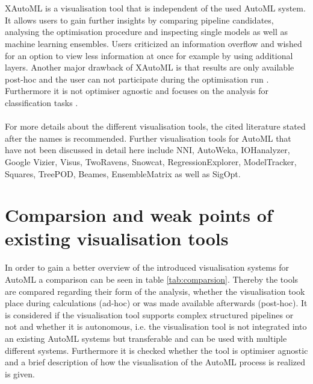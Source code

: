 \\ \\
XAutoML \cite{xautoml} is a visualisation tool that is independent of the used AutoML system. It allows users to gain further insights by comparing pipeline candidates, analysing the optimisation procedure and inspecting single models as well as machine learning ensembles. Users criticized an information overflow and wished for an option to view less information at once for example by using additional layers. Another major drawback of XAutoML is that results are only available post-hoc and the user can not participate during the optimisation run \cite{xautoml}. Furthermore it is not optimiser agnostic and focuses on the analysis for classification tasks \cite{deepcave}.
\\ \\
For more details about the different visualisation tools, the cited literature stated after the names is recommended. Further visualisation tools for AutoML that have not been discussed in detail here include NNI, AutoWeka, IOHanalyzer, Google Vizier, Visus, TwoRavens, Snowcat, RegressionExplorer, ModelTracker, Squares, TreePOD, Beames, EnsembleMatrix as well as SigOpt.

\section{Comparsion and weak points of existing visualisation tools}
\label{sec:realted:comp}

In order to gain a better overview of the introduced visualisation systems for AutoML a comparison can be seen in table \ref{tab:comparsion}. Thereby the tools are compared regarding their form of the analysis, whether the visualisation took place during calculations (ad-hoc) or was made available afterwards (post-hoc). It is considered if the visualisation tool supports complex structured pipelines or not and whether it is autonomous, i.e. the visualisation tool is not integrated into an existing AutoML systems but transferable and can be used with multiple different systems. Furthermore it is checked whether the tool is optimiser agnostic and a brief description of how the visualisation of the AutoML process is realized is given.


